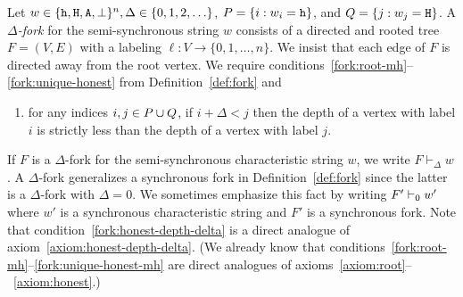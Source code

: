   \begin{definition}\label{def:delta-fork}
    Let $w\in \{\mathtt{h}, \mathtt{H}, \mathtt{A}, \perp\}^n, \Delta \in \{0, 1, 2, \ldots \}$, 
    $P = \{ i : w_i = \mathtt{h}\}$, and $Q = \{ j : w_j = \mathtt{H}\}$. 
    A \emph{$\Delta$-fork} for the semi-synchronous string $w$ consists of a directed and rooted
    tree $F=(V,E)$ with a labeling $\ell:V \to \{0,1,\ldots,n\}$. We insist
    that each edge of $F$ is directed away from the root vertex. 
    We require conditions~\ref{fork:root-mh}--\ref{fork:unique-honest} 
    from Definition~\ref{def:fork} and 
    \begin{enumerate}[label=(F{\arabic*}\textsubscript{$\Delta$}), start=4]



      \item\label{fork:honest-depth-delta} 
      for any indices $i,j\in P \cup Q$, 
      if $i + \Delta < j$ then 
      the depth of a vertex with label $i$ 
      is strictly less than 
      the depth of a vertex with label $j$.
    \end{enumerate}
  \end{definition}
  If $F$ is a $\Delta$-fork for the semi-synchronous characteristic string $w$, we write
  $F\vdash_\Delta w$.  
  A $\Delta$-fork generalizes a synchronous fork in Definition~\ref{def:fork} 
  since the latter is a $\Delta$-fork with $\Delta = 0$. 
  We sometimes emphasize this fact by writing $F' \vdash_0 w'$ 
  where $w'$ is a synchronous characteristic string and $F'$ is a synchronous fork.
  Note that 
  condition~\ref{fork:honest-depth-delta} 
  is a direct analogue of axiom~\ref{axiom:honest-depth-delta}.
  (We already know that conditions~\ref{fork:root-mh}--\ref{fork:unique-honest-mh} 
  are direct
  analogues of axioms~\ref{axiom:root}--~\ref{axiom:honest}.) 


